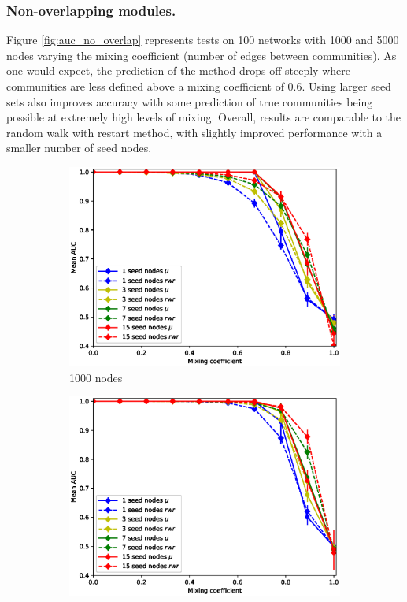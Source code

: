 \documentclass[sigconf]{acmart}
\begin{document}
\subsubsection{Non-overlapping modules.}
Figure \ref{fig:auc_no_overlap} represents tests on 100 networks with 1000 and 5000 nodes varying the mixing coefficient (number of edges between communities).
As one would expect, the prediction of the method drops off steeply where communities are less defined above a mixing coefficient of 0.6.
Using larger seed sets also improves accuracy with some prediction of true communities being possible at extremely high levels of mixing.
Overall, results are comparable to the random walk with restart method, with slightly improved performance with a smaller number of seed nodes.

\begin{figure}[t]
    \centering
    \begin{subfigure}[b]{0.45\textwidth}
        \centering
        \includegraphics[width=\textwidth]{images/lfr_binary_mo_overlap_auc_1000.eps}
        \caption{1000 nodes}
    \end{subfigure}
    \begin{subfigure}[b]{0.45\textwidth}
        \centering
        \includegraphics[width=\textwidth]{images/lfr_binary_mo_overlap_auc_5000.eps}

\end{subfigure}
\end{figure}
\end{document}
